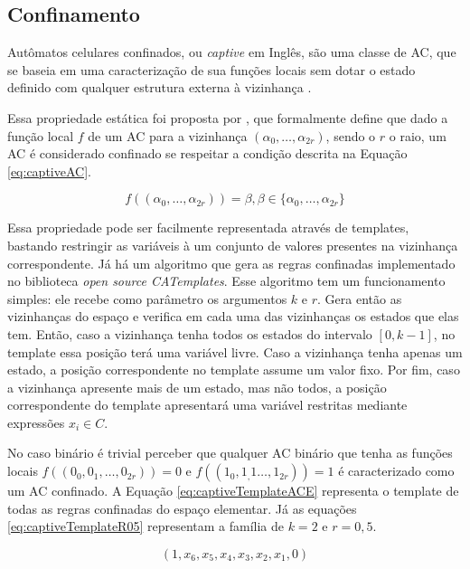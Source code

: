 	\subsection{Confinamento}
	Autômatos celulares confinados, ou \textit{captive} em Inglês, são uma classe de AC, que se baseia em uma caracterização de sua funções locais sem dotar o estado definido com qualquer estrutura externa à vizinhança \cite{theyssier2004captive}. 

	Essa propriedade estática foi proposta por , que formalmente define que dado a função local $f$ de um AC para a vizinhança $(\alpha_0, \dots, \alpha_{2r})$, sendo o $r$ o raio, um AC é considerado confinado se respeitar a condição descrita na Equação \ref{eq:captiveAC}.

	\begin{equation}
	f((\alpha_0, \dots, \alpha_{2r})) = \beta, \beta \in \{\alpha_0, \dots, \alpha_{2r}\}
	\label{eq:captiveAC}
	\end{equation}

	Essa propriedade pode ser facilmente representada através de templates, bastando restringir as variáveis à um conjunto de valores presentes na vizinhança correspondente. Já há um algoritmo que gera as regras confinadas implementado no biblioteca \textit{open source CATemplates}. Esse algoritmo tem um funcionamento simples: ele recebe como parâmetro os argumentos $k$ e $r$. Gera então as vizinhanças do espaço e verifica em cada uma das vizinhanças os estados que elas tem. Então, caso a vizinhança tenha todos os estados do intervalo $[0, k-1]$, no template essa posição terá uma variável livre. Caso a vizinhança tenha apenas um estado, a posição correspondente no template assume um valor fixo. Por fim, caso a vizinhança apresente mais de um estado, mas não todos, a posição correspondente do template apresentará uma variável restritas mediante expressões $x_i \in C$.

	No caso binário é trivial perceber que qualquer AC binário que tenha as funções locais $f((0_0, 0_1,\dots, 0_{2r})) = 0$ e $f((1_0, 1_,1\dots, 1_{2r})) = 1$ é caracterizado como um AC confinado. A Equação \ref{eq:captiveTemplateACE} representa o template de todas as regras confinadas do espaço elementar. Já as equações \ref{eq:captiveTemplateR05} representam a família de $k=2$ e $r=0,5$.

	\begin{equation}
	(1,x_6,x_5,x_4,x_3,x_2,x_1,0)
	\label{eq:captiveTemplateACE}
	\end{equation}

